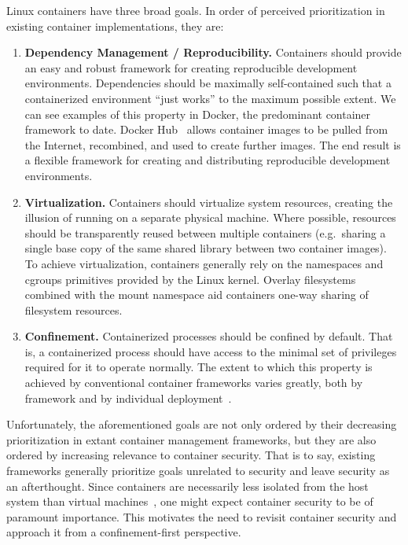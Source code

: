 \begin{inprogress}
Linux containers have three broad goals. In order of perceived prioritization in existing
container implementations, they are:
\begin{enumerate}
  \item \textbf{Dependency Management / Reproducibility.}
    Containers should provide an easy and robust framework for creating reproducible
    development environments. Dependencies should be maximally self-contained such that
    a containerized environment \enquote{just works} to the maximum possible extent. We
    can see examples of this property in Docker, the predominant container framework to
    date. Docker Hub~\cite{docker_hub} allows container images to be pulled from the
    Internet, recombined, and used to create further images. The end result is a flexible
    framework for creating and distributing reproducible development environments.

  \item \textbf{Virtualization.}
    Containers should virtualize system resources, creating the illusion of running on
    a separate physical machine. Where possible, resources should be transparently reused
    between multiple containers (e.g.~sharing a single base copy of the same shared
    library between two container images). To achieve virtualization, containers generally
    rely on the namespaces and cgroups primitives provided by the Linux kernel. Overlay
    filesystems~\cite{overlayfs} combined with the mount namespace aid containers one-way
    sharing of filesystem resources.

  \item \textbf{Confinement.}
    Containerized processes should be confined by default. That is, a containerized
    process should have access to the minimal set of privileges required for it to operate
    normally. The extent to which this property is achieved by conventional container
    frameworks varies greatly, both by framework and by individual
    deployment~\cite{sultan2019_container_security, lin2018_container_security,
    bui2015_docker_analysis}.
\end{enumerate}

Unfortunately, the aforementioned goals are not only ordered by their decreasing
prioritization in extant container management frameworks, but they are also ordered by
increasing relevance to container security. That is to say, existing frameworks generally
prioritize goals unrelated to security and leave security as an afterthought. Since
containers are necessarily less isolated from the host system than virtual
machines~\cite{sultan2019_container_security, eder2016_hypervisor_container}, one might
expect container security to be of paramount importance. This motivates the need to
revisit container security and approach it from a confinement-first perspective.
\end{inprogress}

